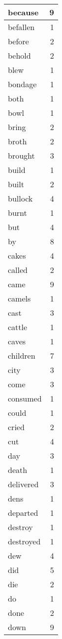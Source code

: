 \begin{center}
\begin{longtable}{l|r}
because & 9\\ \hline 
befallen & 1\\ \hline 
before & 2\\ \hline 
behold & 2\\ \hline 
blew & 1\\ \hline 
bondage & 1\\ \hline 
both & 1\\ \hline 
bowl & 1\\ \hline 
bring & 2\\ \hline 
broth & 2\\ \hline 
brought & 3\\ \hline 
build & 1\\ \hline 
built & 2\\ \hline 
bullock & 4\\ \hline 
burnt & 1\\ \hline 
but & 4\\ \hline 
by & 8\\ \hline 
cakes & 4\\ \hline 
called & 2\\ \hline 
came & 9\\ \hline 
camels & 1\\ \hline 
cast & 3\\ \hline 
cattle & 1\\ \hline 
caves & 1\\ \hline 
children & 7\\ \hline 
city & 3\\ \hline 
come & 3\\ \hline 
consumed & 1\\ \hline 
could & 1\\ \hline 
cried & 2\\ \hline 
cut & 4\\ \hline 
day & 3\\ \hline 
death & 1\\ \hline 
delivered & 3\\ \hline 
dens & 1\\ \hline 
departed & 1\\ \hline 
destroy & 1\\ \hline 
destroyed & 1\\ \hline 
dew & 4\\ \hline 
did & 5\\ \hline 
die & 2\\ \hline 
do & 1\\ \hline 
done & 2\\ \hline 
down & 9\\ \hline 

\end{longtable}
\end{center}
